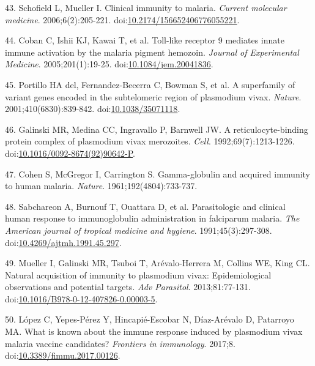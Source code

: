 \documentclass[]{article}
\begin{document}
\hypertarget{ref-schofield2006toll}{}
43. Schofield L, Mueller I. Clinical immunity to malaria. \emph{Current
molecular medicine}. 2006;6(2):205-221.
doi:\href{https://doi.org/10.2174/156652406776055221}{10.2174/156652406776055221}.

\hypertarget{ref-coban2005toll}{}
44. Coban C, Ishii KJ, Kawai T, et al. Toll-like receptor 9 mediates
innate immune activation by the malaria pigment hemozoin. \emph{Journal
of Experimental Medicine}. 2005;201(1):19-25.
doi:\href{https://doi.org/10.1084/jem.20041836}{10.1084/jem.20041836}.

\hypertarget{ref-portillo2001vir}{}
45. Portillo HA del, Fernandez-Becerra C, Bowman S, et al. A superfamily
of variant genes encoded in the subtelomeric region of plasmodium vivax.
\emph{Nature}. 2001;410(6830):839-842.
doi:\href{https://doi.org/10.1038/35071118}{10.1038/35071118}.

\hypertarget{ref-galinski1992rbp}{}
46. Galinski MR, Medina CC, Ingravallo P, Barnwell JW. A
reticulocyte-binding protein complex of plasmodium vivax merozoites.
\emph{Cell}. 1992;69(7):1213-1226.
doi:\href{https://doi.org/10.1016/0092-8674(92)90642-P}{10.1016/0092-8674(92)90642-P}.

\hypertarget{ref-cohen1961}{}
47. Cohen S, McGregor I, Carrington S. Gamma-globulin and acquired
immunity to human malaria. \emph{Nature}. 1961;192(4804):733-737.

\hypertarget{ref-sabchareon1991}{}
48. Sabchareon A, Burnouf T, Ouattara D, et al. Parasitologic and
clinical human response to immunoglobulin administration in falciparum
malaria. \emph{The American journal of tropical medicine and hygiene}.
1991;45(3):297-308.
doi:\href{https://doi.org/10.4269/ajtmh.1991.45.297}{10.4269/ajtmh.1991.45.297}.

\hypertarget{ref-mueller2013}{}
49. Mueller I, Galinski MR, Tsuboi T, Arévalo-Herrera M, Collins WE,
King CL. Natural acquisition of immunity to plasmodium vivax:
Epidemiological observations and potential targets. \emph{Adv
Parasitol}. 2013;81:77-131.
doi:\href{https://doi.org/10.1016/B978-0-12-407826-0.00003-5}{10.1016/B978-0-12-407826-0.00003-5}.

\hypertarget{ref-lopez2017}{}
50. López C, Yepes-Pérez Y, Hincapié-Escobar N, Díaz-Arévalo D,
Patarroyo MA. What is known about the immune response induced by
plasmodium vivax malaria vaccine candidates? \emph{Frontiers in
immunology}. 2017;8.
doi:\href{https://doi.org/10.3389/fimmu.2017.00126}{10.3389/fimmu.2017.00126}.
\end{document}
